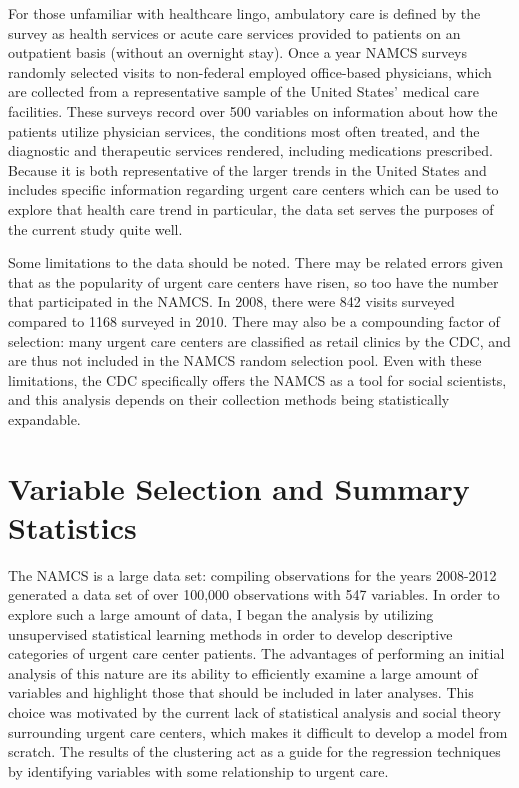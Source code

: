 \documentclass[12pt,twoside]{reedthesis}
\begin{document}
  For those unfamiliar with healthcare lingo, ambulatory care is defined
  by the survey as health services or acute care services provided to
  patients on an outpatient basis (without an overnight stay). Once a year
  NAMCS surveys randomly selected visits to non-federal employed
  office-based physicians, which are collected from a representative
  sample of the United States' medical care facilities. These surveys
  record over 500 variables on information about how the patients utilize
  physician services, the conditions most often treated, and the
  diagnostic and therapeutic services rendered, including medications
  prescribed. Because it is both representative of the larger trends in
  the United States and includes specific information regarding urgent
  care centers which can be used to explore that health care trend in
  particular, the data set serves the purposes of the current study quite
  well.
  
  Some limitations to the data should be noted. There may be related
  errors given that as the popularity of urgent care centers have risen,
  so too have the number that participated in the NAMCS. In 2008, there
  were 842 visits surveyed compared to 1168 surveyed in 2010. There may
  also be a compounding factor of selection: many urgent care centers are
  classified as retail clinics by the CDC, and are thus not included in
  the NAMCS random selection pool. Even with these limitations, the CDC
  specifically offers the NAMCS as a tool for social scientists, and this
  analysis depends on their collection methods being statistically
  expandable.
  
  \section*{Variable Selection and Summary
  Statistics}\label{variable-selection-and-summary-statistics}
  
  The NAMCS is a large data set: compiling observations for the years
  2008-2012 generated a data set of over 100,000 observations with 547
  variables. In order to explore such a large amount of data, I began the
  analysis by utilizing unsupervised statistical learning methods in order
  to develop descriptive categories of urgent care center patients. The
  advantages of performing an initial analysis of this nature are its
  ability to efficiently examine a large amount of variables and highlight
  those that should be included in later analyses. This choice was
  motivated by the current lack of statistical analysis and social theory
  surrounding urgent care centers, which makes it difficult to develop a
  model from scratch. The results of the clustering act as a guide for the
  regression techniques by identifying variables with some relationship to
  urgent care.
  
\end{document}
